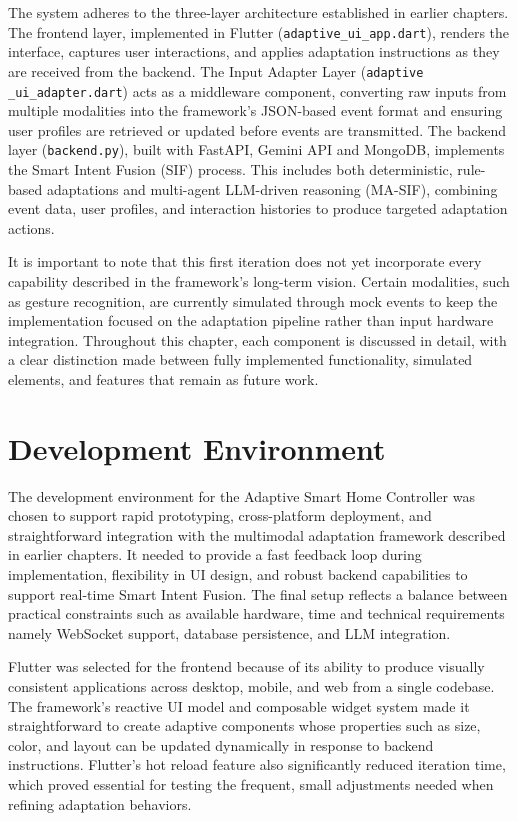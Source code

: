 \documentclass[openany]{book}
\begin{document}
The system adheres to the three-layer architecture established in earlier chapters. The frontend layer, implemented in Flutter (\texttt{adaptive\_ui\_app.dart}), renders the interface, captures user interactions, and applies adaptation instructions as they are received from the backend. The Input Adapter Layer (\texttt{adaptive\\\_ui\_adapter.dart}) acts as a middleware component, converting raw inputs from multiple modalities into the framework’s JSON-based event format and ensuring user profiles are retrieved or updated before events are transmitted. The backend layer (\texttt{backend.py}), built with FastAPI, Gemini API and MongoDB, implements the Smart Intent Fusion (SIF) process. This includes both deterministic, rule-based adaptations and multi-agent LLM-driven reasoning (MA-SIF), combining event data, user profiles, and interaction histories to produce targeted adaptation actions.

It is important to note that this first iteration does not yet incorporate every capability described in the framework’s long-term vision. Certain modalities, such as gesture recognition, are currently simulated through mock events to keep the implementation focused on the adaptation pipeline rather than input hardware integration. Throughout this chapter, each component is discussed in detail, with a clear distinction made between fully implemented functionality, simulated elements, and features that remain as future work.

\section{Development Environment}
The development environment for the Adaptive Smart Home Controller was chosen to support rapid prototyping, cross-platform deployment, and straightforward integration with the multimodal adaptation framework described in earlier chapters. It needed to provide a fast feedback loop during implementation, flexibility in UI design, and robust backend capabilities to support real-time Smart Intent Fusion. The final setup reflects a balance between practical constraints such as available hardware, time and technical requirements namely WebSocket support, database persistence, and LLM integration.

Flutter was selected for the frontend because of its ability to produce visually consistent applications across desktop, mobile, and web from a single codebase. The framework’s reactive UI model and composable widget system made it straightforward to create adaptive components whose properties such as size, color, and layout can be updated dynamically in response to backend instructions. Flutter’s hot reload feature also significantly reduced iteration time, which proved essential for testing the frequent, small adjustments needed when refining adaptation behaviors.
\end{document}
